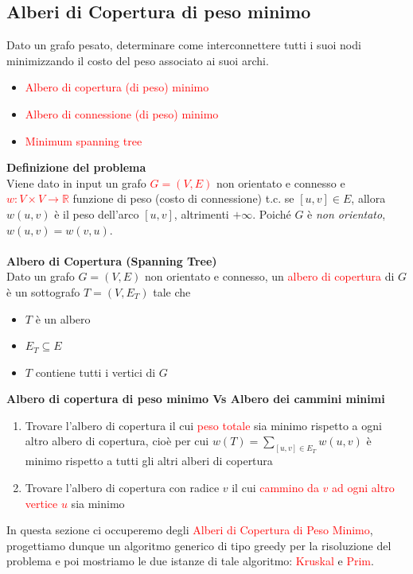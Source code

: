 \documentclass[../cheatSheetAlgoritmi.tex]{subfiles}
\begin{document}
\subsection{Alberi di Copertura di peso minimo}
Dato un grafo pesato, determinare come interconnettere tutti i suoi nodi minimizzando il costo del peso associato ai suoi archi.
\begin{itemize}
	\item \textcolor{red}{Albero di copertura (di peso) minimo}
	\item \textcolor{red}{Albero di connessione (di peso) minimo}
	\item \textcolor{red}{Minimum spanning tree}
\end{itemize}
\textbf{Definizione del problema}\\
Viene dato in input un grafo \textcolor{red}{$G = (V, E)$} non orientato e connesso e  \textcolor{red}{$w: V \times V \rightarrow \mathbb{R}$} funzione di peso (costo di connessione) t.c. se $[u, v] \in E$, allora $w(u, v)$ è il peso dell'arco $[u, v]$, altrimenti $+\infty$. Poiché $G$ è \emph{non orientato}, $w(u, v) = w(v, u)$.\\\\
\textbf{Albero di Copertura (Spanning Tree)}\\
Dato un grafo $G = (V, E)$ non orientato e connesso, un \textcolor{red}{albero di copertura} di $G$ è un sottografo $T = (V, E_{T})$ tale che 
\begin{itemize}
	\item $T$ è un albero
	\item $E_{T} \subseteq E$
	\item $T$ contiene tutti i vertici di $G$
\end{itemize}
\textbf{Albero di copertura di peso minimo Vs Albero dei cammini minimi}
\begin{enumerate}
	\item Trovare l'albero di copertura il cui \textcolor{red}{peso totale} sia minimo rispetto a ogni altro albero di copertura, cioè per cui $w(T) = \sum_{[u, v] \in E_{T}}w(u, v)$ è minimo rispetto a tutti gli altri alberi di copertura
	\item Trovare l'albero di copertura con radice $v$ il cui \textcolor{red}{cammino da $v$ ad ogni altro vertice $u$} sia minimo
\end{enumerate}
In questa sezione ci occuperemo degli \textcolor{red}{Alberi di Copertura di Peso Minimo}, progettiamo dunque un algoritmo generico di tipo greedy per la risoluzione del problema e poi mostriamo le due istanze di tale algoritmo: \textcolor{red}{Kruskal} e \textcolor{red}{Prim}.\\
\end{document}
